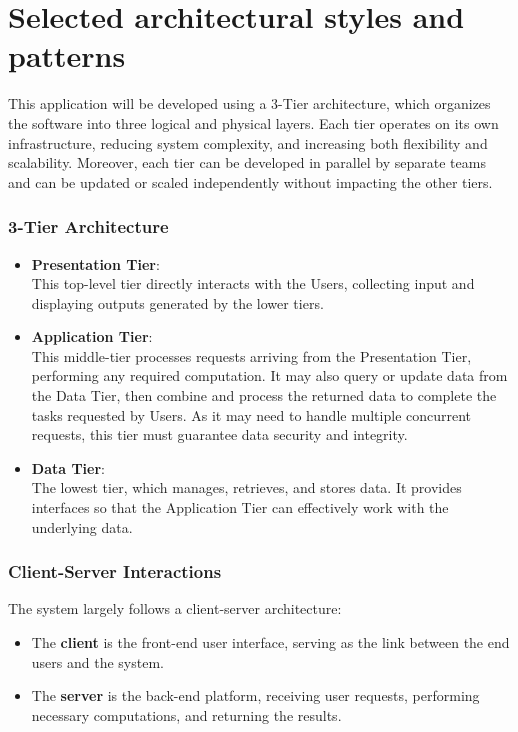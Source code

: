 \newpage
\section{Selected architectural styles and patterns}

This application will be developed using a 3-Tier architecture, which organizes the software into three logical and physical layers. Each tier operates on its own infrastructure, reducing system complexity, and increasing both flexibility and scalability. Moreover, each tier can be developed in parallel by separate teams and can be updated or scaled independently without impacting the other tiers.

\subsubsection*{3-Tier Architecture}

\begin{itemize}
    \item \textbf{Presentation Tier}: \\
    This top-level tier directly interacts with the Users, collecting input and displaying outputs generated by the lower tiers.
    \item \textbf{Application Tier}:\\
    This middle-tier processes requests arriving from the Presentation Tier, performing any required computation. It may also query or update data from the Data Tier, then combine and process the returned data to complete the tasks requested by Users. As it may need to handle multiple concurrent requests, this tier must guarantee data security and integrity.
    \item \textbf{Data Tier}:\\
    The lowest tier, which manages, retrieves, and stores data. It provides interfaces so that the Application Tier can effectively work with the underlying data.
\end{itemize}

\subsubsection*{Client-Server Interactions}

The system largely follows a client-server architecture:
\begin{itemize}
    \item The \textbf{client} is the front-end user interface, serving as the link between the end users and the system.
    \item The \textbf{server} is the back-end platform, receiving user requests, performing necessary computations, and returning the results.
\end{itemize}

